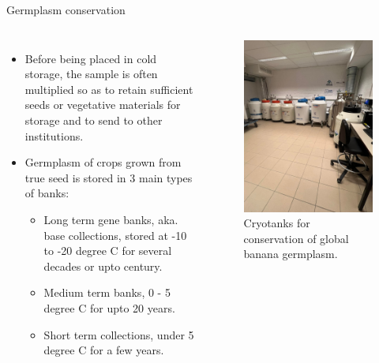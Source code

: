 \documentclass[11pt,ignorenonframetext,aspectratio=169]{beamer}
\begin{document}
\begin{frame}{Germplasm conservation}
\protect\hypertarget{germplasm-conservation}{}
\begin{columns}[T, onlytextwidth]

\footnotesize
\begin{itemize}
\item Before being placed in cold storage, the sample is often multiplied so as to retain sufficient seeds or vegetative materials for storage and to send to other institutions.
\item Germplasm of crops grown from true seed is stored in 3 main types of banks:
  \begin{itemize}
  \footnotesize
  \item Long term gene banks, aka. base collections, stored at -10 to -20 degree C for several decades or upto century.
  \item Medium term banks, 0 - 5 degree C for upto 20 years.
  \item Short term collections, under 5 degree C for a few years.
  \end{itemize}
\end{itemize}


\begin{figure}
\includegraphics[width=0.64\linewidth]{./images/cryo-tanks-banana} \caption{Cryotanks for conservation of global banana germplasm.}\label{fig:cryo-tank-banana}
\end{figure}

\end{columns}
\end{frame}
\end{document}
